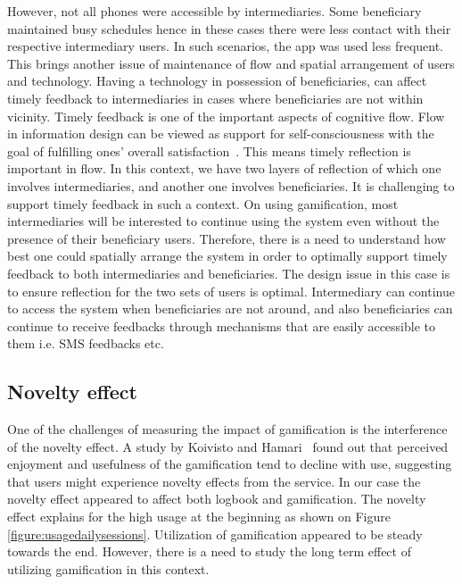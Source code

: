 \documentclass{sig-alternate}
\begin{document}
However, not all phones were accessible by intermediaries. Some beneficiary maintained busy schedules hence in these cases there were less contact with their respective intermediary users. In such scenarios, the app was used less frequent. This brings another issue of maintenance of flow and spatial arrangement of users and technology. Having a technology in possession of beneficiaries, can affect timely feedback to intermediaries in cases where beneficiaries are not within vicinity. Timely feedback is one of the important aspects of cognitive flow. Flow in information design can be viewed as support for self-consciousness with the goal of fulfilling ones' overall satisfaction~\cite{csikszentmihalyiflow}. This means timely reflection is important in flow. In this context, we have two layers of reflection of which one involves intermediaries, and another one involves beneficiaries. It is challenging to support timely feedback in such a context. On using gamification, most intermediaries will be interested to continue using the system even without the presence of their beneficiary users. Therefore, there is a need to understand how best one could spatially arrange the system in order to optimally support timely feedback to both intermediaries and beneficiaries. The design issue in this case is to ensure reflection for the two sets of users is optimal. Intermediary can continue to access the system when beneficiaries are not around, and also beneficiaries can continue to receive feedbacks through mechanisms that are easily accessible to them i.e. SMS feedbacks etc.
\subsection*{\textbf{Novelty effect}}
One of the challenges of measuring the impact of gamification is the interference of the novelty effect. A study by Koivisto and Hamari~\cite{koivisto2014demographic} found out that perceived enjoyment and usefulness of the gamification tend to decline with use, suggesting that users might experience novelty effects from the service. In our case the novelty effect appeared to affect both logbook and gamification. The novelty effect explains for the high usage at the beginning as shown on Figure \ref{figure:usagedailysessions}. Utilization of gamification appeared to be steady towards the end. However, there is a need to study the long term effect of utilizing gamification in this context.
\end{document}
